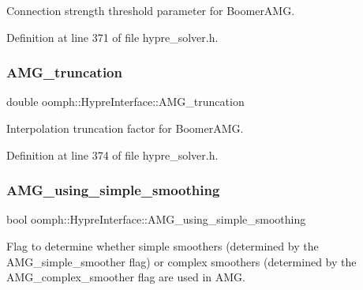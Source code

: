 Connection strength threshold parameter for Boomer\+A\+MG. 



Definition at line 371 of file hypre\+\_\+solver.\+h.

\mbox{\label{classoomph_1_1HypreInterface_a8fa7abd65dec3d2318a36d8fddb96a46}} 
\subsubsection{\texorpdfstring{A\+M\+G\+\_\+truncation}{AMG\_truncation}}
{\footnotesize\ttfamily double oomph\+::\+Hypre\+Interface\+::\+A\+M\+G\+\_\+truncation\hspace{0.3cm}{\ttfamily [protected]}}



Interpolation truncation factor for Boomer\+A\+MG. 



Definition at line 374 of file hypre\+\_\+solver.\+h.

\mbox{\label{classoomph_1_1HypreInterface_aa4bac4203fb7ec08f5a9fc7cf3f47161}} 
\subsubsection{\texorpdfstring{A\+M\+G\+\_\+using\+\_\+simple\+\_\+smoothing}{AMG\_using\_simple\_smoothing}}
{\footnotesize\ttfamily bool oomph\+::\+Hypre\+Interface\+::\+A\+M\+G\+\_\+using\+\_\+simple\+\_\+smoothing\hspace{0.3cm}{\ttfamily [protected]}}



Flag to determine whether simple smoothers (determined by the A\+M\+G\+\_\+simple\+\_\+smoother flag) or complex smoothers (determined by the A\+M\+G\+\_\+complex\+\_\+smoother flag are used in A\+MG. 




